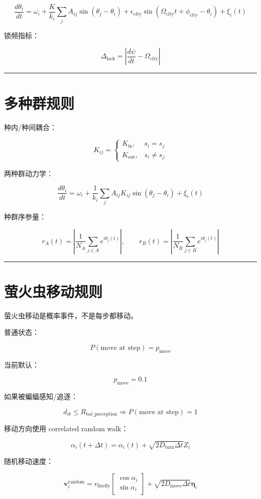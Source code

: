 \documentclass[UTF8]{ctexart}
\begin{document}
\[
\frac{d\theta_i}{dt}
=
\omega_i
+
\frac{K}{k_i}
\sum_j A_{ij}\sin(\theta_j-\theta_i)
+
\epsilon_{\text{city}}
\sin(\Omega_{\text{city}}t+\phi_{\text{city}}-\theta_i)
+
\xi_i(t)
\]

锁频指标：

\[
\Delta_{\text{lock}}
=
\left|
\frac{d\psi}{dt}
-
\Omega_{\text{city}}
\right|
\]

\bigskip
\hrule
\bigskip

\section{多种群规则}

种内/种间耦合：

\[
K_{ij}
=
\begin{cases}
K_{\text{in}},&s_i=s_j\\
K_{\text{out}},&s_i\ne s_j
\end{cases}
\]

两种群动力学：

\[
\frac{d\theta_i}{dt}
=
\omega_i+
\frac{1}{k_i}
\sum_j A_{ij}K_{ij}\sin(\theta_j-\theta_i)
+
\xi_i(t)
\]

种群序参量：

\[
r_A(t)=
\left|
\frac{1}{N_A}
\sum_{j\in A}e^{i\theta_j(t)}
\right|,
\qquad
r_B(t)=
\left|
\frac{1}{N_B}
\sum_{j\in B}e^{i\theta_j(t)}
\right|
\]

\bigskip
\hrule
\bigskip

\section{萤火虫移动规则}

萤火虫移动是概率事件，不是每步都移动。

普通状态：

\[
P(\text{move at step})=p_{\text{move}}
\]

当前默认：

\[
p_{\text{move}}=0.1
\]

如果被蝙蝠感知/追逐：

\[
d_{ib}\le R_{\text{bat\_perception}}
\Longrightarrow
P(\text{move at step})=1
\]

移动方向使用 correlated random walk：

\[
\alpha_i(t+\Delta t)
=
\alpha_i(t)
+
\sqrt{2D_{\text{turn}}\Delta t}Z_i
\]

随机移动速度：

\[
\mathbf{v}_i^{\text{random}}
=
v_{\text{firefly}}
\begin{bmatrix}
\cos\alpha_i\\
\sin\alpha_i
\end{bmatrix}
+
\sqrt{2D_{\text{move}}\Delta t}\boldsymbol{\eta}_i
\]
\end{document}
